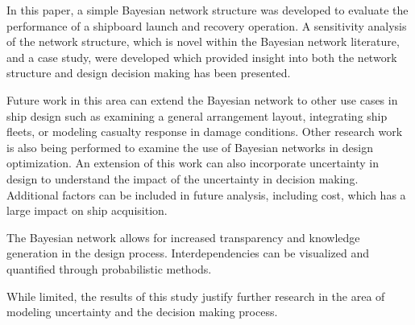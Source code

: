 \documentclass{svproc}
\begin{document}
In this paper, a simple Bayesian network structure was developed to evaluate the performance of a shipboard launch and recovery operation. A sensitivity analysis of the network structure, which is novel within the Bayesian network literature, and a case study, were developed which provided insight into both the network structure and design decision making has been presented. 

Future work in this area can extend the Bayesian network to other use cases in ship design such as examining a general arrangement layout, integrating ship fleets, or modeling casualty response in damage conditions. Other research work is also being performed to examine the use of Bayesian networks in design optimization. An extension of this work can also incorporate uncertainty in design to understand the impact of the uncertainty in decision making. Additional factors can be included in future analysis, including cost, which has a large impact on ship acquisition. 

The Bayesian network allows for increased transparency and knowledge generation in the design process. Interdependencies can be visualized and quantified through probabilistic methods. 

While limited, the results of this study justify further research in the area of modeling uncertainty and the decision making process. 

%
%
%

\end{document}
